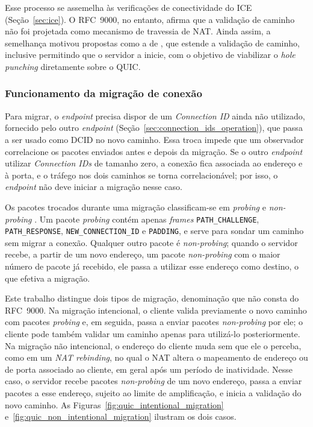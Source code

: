 Esse processo se assemelha às verificações de conectividade do ICE (Seção~\ref{sec:ice}). O RFC~9000, no entanto, afirma que a validação de caminho não foi projetada como mecanismo de travessia de NAT. Ainda assim, a semelhança motivou propostas como a de \citep{draft-seemann-quic-nat-traversal}, que estende a validação de caminho, inclusive permitindo que o servidor a inicie, com o objetivo de viabilizar o \textit{hole punching} diretamente sobre o QUIC.

\subsubsection{Funcionamento da migração de conexão}
\label{sec:quic_connection_migration_process}

Para migrar, o \textit{endpoint} precisa dispor de um \textit{Connection ID} ainda não utilizado, fornecido pelo outro \textit{endpoint} (Seção~\ref{sec:connection_ids_operation}), que passa a ser usado como DCID no novo caminho. Essa troca impede que um observador correlacione os pacotes enviados antes e depois da migração. Se o outro \textit{endpoint} utilizar \textit{Connection IDs} de tamanho zero, a conexão fica associada ao endereço e à porta, e o tráfego nos dois caminhos se torna correlacionável; por isso, o \textit{endpoint} não deve iniciar a migração nesse caso.

Os pacotes trocados durante uma migração classificam-se em \textit{probing} e \textit{non-probing} \citep{rfc9000}. Um pacote \textit{probing} contém apenas \textit{frames} \texttt{PATH\_\allowbreak{}CHALLENGE}, \texttt{PATH\_\allowbreak{}RESPONSE}, \texttt{NEW\_\allowbreak{}CONNECTION\_\allowbreak{}ID} e \texttt{PADDING}, e serve para sondar um caminho sem migrar a conexão. Qualquer outro pacote é \textit{non-probing}; quando o servidor recebe, a partir de um novo endereço, um pacote \textit{non-probing} com o maior número de pacote já recebido, ele passa a utilizar esse endereço como destino, o que efetiva a migração.

Este trabalho distingue dois tipos de migração, denominação que não consta do RFC~9000. Na migração intencional, o cliente valida previamente o novo caminho com pacotes \textit{probing} e, em seguida, passa a enviar pacotes \textit{non-probing} por ele; o cliente pode também validar um caminho apenas para utilizá-lo posteriormente. Na migração não intencional, o endereço do cliente muda sem que ele o perceba, como em um \textit{NAT rebinding}, no qual o NAT altera o mapeamento de endereço ou de porta associado ao cliente, em geral após um período de inatividade. Nesse caso, o servidor recebe pacotes \textit{non-probing} de um novo endereço, passa a enviar pacotes a esse endereço, sujeito ao limite de amplificação, e inicia a validação do novo caminho. As Figuras~\ref{fig:quic_intentional_migration} e~\ref{fig:quic_non_intentional_migration} ilustram os dois casos.

